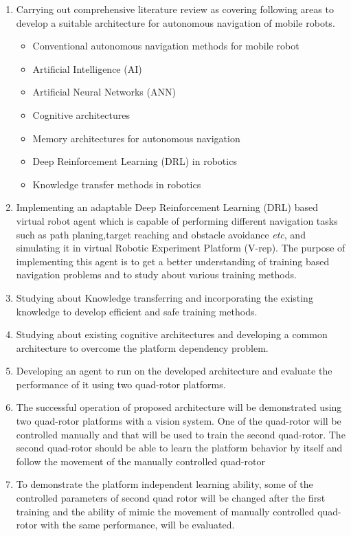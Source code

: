 \documentclass[a4paper,oneside,12pt]{report}
\begin{document}
\begin{enumerate}
\item Carrying out comprehensive literature review as covering following areas to develop a suitable architecture for autonomous navigation of mobile robots.
	\begin{itemize}
		\item Conventional autonomous navigation methods for mobile robot
		\item Artificial Intelligence (AI)
		\item Artificial Neural Networks (ANN)\cite{R09}
		\item Cognitive architectures
		\item Memory architectures for autonomous navigation
		\item Deep Reinforcement Learning (DRL) in robotics 
		\item Knowledge transfer methods in robotics

	\end{itemize}
	
\item Implementing an adaptable Deep Reinforcement Learning (DRL) based virtual robot agent which is capable of performing different navigation tasks such as path planing,target reaching and obstacle avoidance \textit{etc}, and simulating it in virtual Robotic Experiment Platform (V-rep)\cite{R60}. The purpose of implementing this agent is to get a better understanding of training based navigation problems and to study about various training methods.

\item Studying about Knowledge transferring and incorporating the existing knowledge to develop efficient and safe training methods.

\item Studying about existing cognitive architectures and developing a common architecture to overcome the platform dependency problem.

\item Developing an agent to run on the developed architecture and evaluate the performance of it using two quad-rotor platforms.

\item The successful operation of proposed architecture will be demonstrated using two quad-rotor platforms with a vision system. One of the quad-rotor will be controlled manually and that will be used to train the second quad-rotor. The second quad-rotor should be able to learn the platform behavior by itself and follow the movement of the manually controlled quad-rotor

\item To demonstrate the platform independent learning ability, some of the controlled parameters of second quad rotor will be changed after the first training and the ability of mimic the movement of  manually controlled quad-rotor with the same performance, will be evaluated.



\end{enumerate}
\end{document}

